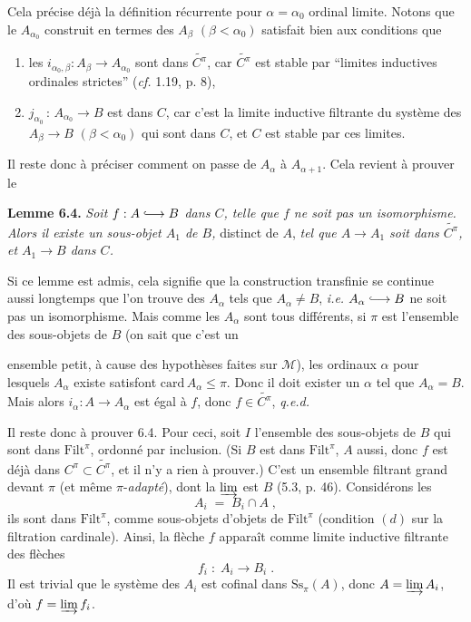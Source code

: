 \documentclass[11pt]{article}
\newcommand{\printedpage}[1]{\marginpar{\footnotesize p.~#1}}
\newcommand{\msp}[1]{\marginpar{\footnotesize [#1]}}
\newcommand{\Filt}{\mathrm{Filt}}
\newcommand{\Ss}{\mathrm{Ss}}
\newcommand{\M}{\mathcal{M}}
\newcommand{\into}{\lhook\joinrel\longrightarrow}
\begin{document}
\msp{page 79}
Cela précise déjà la définition récurrente pour $\alpha = \alpha_{0}$ ordinal limite. Notons que le $A_{\alpha_{0}}$ construit en termes des $A_{\beta}$ $(\beta < \alpha_{0})$ satisfait bien aux conditions que
\begin{enumerate}[label={}]
\item[\textit{a})] les $i_{\alpha_{0},\beta} : A_{\beta} \longrightarrow A_{\alpha_{0}}$ sont dans $\widetilde{C^{\pi}}$, car $\widetilde{C^{\pi}}$ est stable par ``limites inductives ordinales strictes'' (\textit{cf.} 1.19, p. 8),
\item[\textit{b})] $j_{\alpha_{0}} \, : \, A_{\alpha_{0}} \longrightarrow B$ est dans $C$, car c'est la limite inductive filtrante du système des $A_{\beta} \longrightarrow B$ $(\beta < \alpha_{0})$ qui sont dans $C$, et $C$ est stable par ces limites.
\end{enumerate}
Il reste donc à préciser comment on passe de $A_{\alpha}$ à $A_{\alpha+1}$. Cela revient à prouver le

\textbf{Lemme 6.4.} \textit{Soit $f : A \into B$ dans $C$, telle que $f$ ne soit pas un isomorphisme. Alors il existe un sous-objet $A_{1}$ de $B$,} distinct de $A$, \textit{tel que $A \longrightarrow A_{1}$ soit dans $\widetilde{C^{\pi}}$, et $A_{1} \longrightarrow B$ dans $C$.}

Si ce lemme est admis, cela signifie que la construction transfinie se continue aussi longtemps que l'on trouve des $A_{\alpha}$ tels que $A_{\alpha} \neq B$, \textit{i.e.} $A_{\alpha} \into B$ ne soit pas un isomorphisme. Mais comme les $A_{\alpha}$ sont tous différents, si $\pi$ est l'ensemble des sous-objets de $B$ (on sait que c'est un

\printedpage{44}

\msp{page 80}
ensemble petit, à cause des hypothèses faites sur $\M$), les ordinaux $\alpha$ pour lesquels $A_\alpha$ existe satisfont $\mathrm{card}\,A_\alpha \leq \pi$. Donc il doit exister un $\alpha$ tel que $A_\alpha = B$. Mais alors $i_\alpha : A \longrightarrow A_\alpha$ est égal à $f$, donc $f \in \widetilde{C^{\pi}}$, \quad \textit{q.e.d.}

Il reste donc à prouver 6.4. Pour ceci, soit $I$ l'ensemble des sous-objets de $B$ qui sont dans $\Filt^{\pi}$, ordonné par inclusion. (Si $B$ est dans $\Filt^{\pi}$, $A$ aussi, donc $f$ est déjà dans $C^{\pi} \subset \widetilde{C^{\pi}}$, et il n'y a rien à prouver.) C'est un ensemble filtrant grand devant $\pi$ (et même $\pi$-\textit{adapté}), dont la $\varinjlim$ est $B$ (5.3, p. 46). Considérons les
\[
A_i \;=\; B_i \cap A \;,
\]
ils sont dans $\Filt^{\pi}$, comme sous-objets d'objets de $\Filt^{\pi}$ (condition $(d)$ sur la filtration cardinale). Ainsi, la flèche $f$ apparaît comme limite inductive filtrante des flèches
\[
f_i \;:\; A_i \longrightarrow B_i \;.
\]
Il est trivial que le système des $A_i$ est cofinal dans $\Ss_{\pi}(A)$, donc $A = \varinjlim A_i$, d'où $f = \varinjlim f_i$.
\end{document}
